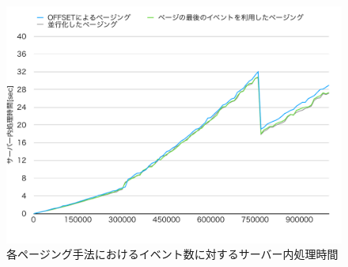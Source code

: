 \documentclass[../../../../../main]{subfiles}
\begin{document}
    \begin{figure}[H]
        \centering
        \includegraphics[width=12cm]{graph}
        \caption{各ページング手法におけるイベント数に対するサーバー内処理時間}
        \label{fig:each-paging-server-time-app_1_1024-db_1_1024}
    \end{figure}
\end{document}
